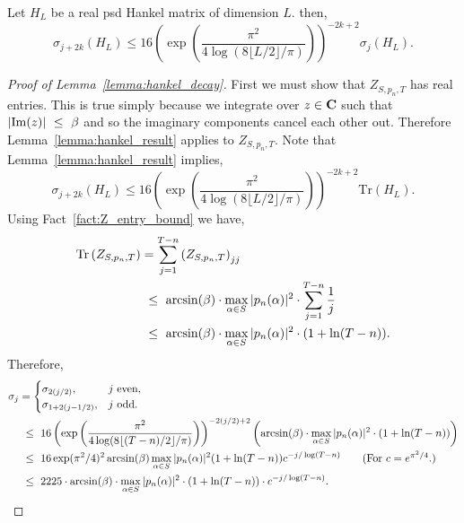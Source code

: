 \begin{lemma}
\label{lemma:hankel_result}
    Let $H_L$ be a real psd Hankel matrix of dimension $L$. then,
    \begin{equation}
    \label{eqn:eig_decay1}
        \sigma_{j + 2k}(H_L) \leq 16 \left( \exp \left( \frac{\pi^2}{4 \log(8 \lfloor L/2 \rfloor / \pi ) }\right) \right)^{-2k + 2} \sigma_j(H_L).
    \end{equation}
\end{lemma}
\begin{proof}[Proof of Lemma~\ref{lemma:hankel_decay}]
First we must show that $Z_{S, p_n, T}$ has real entries. This is true simply because we integrate over $z \in \mathbf{C}$ such that $|\mathrm{Im}(z)| ~\le~ \beta$ and so the imaginary components cancel each other out.  Therefore Lemma~\ref{lemma:hankel_result} applies to $Z_{S, p_n, T}$. 
        Note that Lemma~\ref{lemma:hankel_result} implies,
        \begin{equation*}
        \sigma_{j + 2k}(H_L) \leq 16 \left( \exp \left( \frac{\pi^2}{4 \log(8 \lfloor L/2 \rfloor / \pi ) }\right) \right)^{-2k + 2} \mathrm{Tr}(H_L).
        \end{equation*}
        Using Fact~\ref{fact:Z_entry_bound} we have,
        \begin{align*}
            \mathrm{Tr}\left( Z_{S, p_n, T} \right)   & = \sum_{j = 1}^{T-n} \left( Z_{S, p_n, T} \right)_{jj} \\
            & ~\le~   \arcsin(\beta)  \cdot \max_{\alpha \in S} |p_n(\alpha)|^2  \cdot \sum_{j = 1}^{T-n} \frac{1}{j} \\
            & ~\le~   \arcsin(\beta)  \cdot \max_{\alpha \in S} |p_n(\alpha)|^2 \cdot (1 +  \ln(T-n)).
        \end{align*}
        Therefore,
        \begin{align*}
        \sigma_{j} & = \begin{cases} \sigma_{2(j/2)}, & \textrm{$j$ even}, \\
        \sigma_{1 + 2(j-1/2)}, & \textrm{$j$ odd.}
        \end{cases} \\
        & \leq 16 \left( \exp \left( \frac{\pi^2}{4 \log(8 \lfloor (T-n) /2 \rfloor / \pi ) }\right) \right)^{-2(j/2) + 2} \left(  \arcsin(\beta)  \cdot \max_{\alpha \in S} \abs{p_n(\alpha)}^2 \cdot (1 +  \ln(T-n)) \right) \\
        &  \leq 16 \exp(\pi^2/4)^2 \arcsin(\beta) \max_{\alpha \in S} \abs{p_n(\alpha)}^2 (1 + \ln(T-n)) c^{-j/\log(T-n)} \tag{For $c = e^{\pi^2/4}$.}\\
        &  \leq 2225 \cdot   \arcsin(\beta)  \cdot \max_{\alpha \in S} \abs{p_n(\alpha)}^2 \cdot (1 +  \ln(T-n)) \cdot c^{-j/\log(T-n)}.
        \end{align*}
\end{proof}
